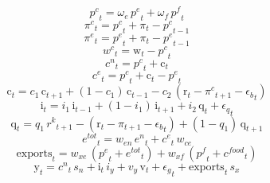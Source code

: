 \begin{dmath}
{{p^{c}}}_{t}={{\omega_{e}}}\, {{p^{e}}}_{t}+{{\omega_{f}}}\, {{p^{f}}}_{t}
\end{dmath}
\begin{dmath}
{{\pi^{c}}}_{t}={{p^{c}}}_{t}+{{\pi}}_{t}-{{p^{c}}}_{t-1}
\end{dmath}
\begin{dmath}
{{\pi^{e}}}_{t}={{p^{e}}}_{t}+{{\pi}}_{t}-{{p^{e}}}_{t-1}
\end{dmath}
\begin{dmath}
{{w^{c}}}_{t}={{\mathrm{w}}}_{t}-{{p^{c}}}_{t}
\end{dmath}
\begin{dmath}
{{c^{n}}}_{t}={{p^{c}}}_{t}+{{\mathrm{c}}}_{t}
\end{dmath}
\begin{dmath}
{{c^{e}}}_{t}={{p^{c}}}_{t}+{{\mathrm{c}}}_{t}-{{p^{e}}}_{t}
\end{dmath}
\begin{dmath}
{{\mathrm{c}}}_{t}={{c_{1}}}\, {{\mathrm{c}}}_{t+1}+\left(1-{{c_{1}}}\right)\, {{\mathrm{c}}}_{t-1}-{{c_{2}}}\, \left({{\mathrm{r}}}_{t}-{{\pi^{c}}}_{t+1}-{{\epsilon_{b}}}_{t}\right)
\end{dmath}
\begin{dmath}
{{\mathrm{i}}}_{t}={{i_{1}}}\, {{\mathrm{i}}}_{t-1}+\left(1-{{i_{1}}}\right)\, {{\mathrm{i}}}_{t+1}+{{i_{2}}}\, {{\mathrm{q}}}_{t}+{{\epsilon_{q}}}_{t}
\end{dmath}
\begin{dmath}
{{\mathrm{q}}}_{t}={{q_{1}}}\, {{r^{k}}}_{t+1}-\left({{\mathrm{r}}}_{t}-{{\pi}}_{t+1}-{{\epsilon_{b}}}_{t}\right)+\left(1-{{q_{1}}}\right)\, {{\mathrm{q}}}_{t+1}
\end{dmath}
\begin{dmath}
{{e^{tot}}}_{t}={{w_{en}}}\, {{e^{n}}}_{t}+{{c^{e}}}_{t}\, {{w_{ce}}}
\end{dmath}
\begin{dmath}
{{\mathrm{exports}}}_{t}={{w_{xe}}}\, \left({{p^{e}}}_{t}+{{e^{tot}}}_{t}\right)+{{w_{xf}}}\, \left({{p^{f}}}_{t}+{{c^{food}}}_{t}\right)
\end{dmath}
\begin{dmath}
{{\mathrm{y}}}_{t}={{c^{n}}}_{t}\, {{s_{n}}}+{{\mathrm{i}}}_{t}\, {{i_{y}}}+{{v_{y}}}\, {{\mathrm{v}}}_{t}+{{\epsilon_{g}}}_{t}+{{\mathrm{exports}}}_{t}\, {{s_{x}}}
\end{dmath}
